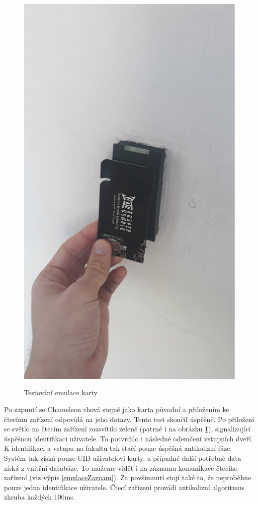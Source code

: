\begin{figure}[ht]\centering
  \centering
  \includegraphics[width=\linewidth, angle=270]{obrazky-figures/obrazekPokusEmulace.jpg}\\[1pt]  
  \caption{Testování emulace karty}    
  \label{obrazekPokusEmulace}
\end{figure}
Po zapnutí se Chameleon chová stejně jako karta původní a přiložením ke čtecímu zařízení odpovídá na jeho dotazy. Tento test skončil úspěšně. Po přiložení se světlo na čtecím zařízení rozsvítilo zeleně (patrné i na obrázku \ref{obrazekPokusEmulace}), signalizující úspěšnou identifikaci uživatele. To potvrdilo i následné odemčení vstupních dveří. K identifikaci a vstupu na fakultu tak stačí pouze úspěšná antikolizní fáze. Systém tak získá pouze UID uživatelovi karty, a případné další potřebné data získá z vnitřní databáze. To můžeme vidět i na záznamu komunikace čtecího zařízení (viz výpis \ref{emulaceZaznam}).  Za povšimnutí stojí také to, že neproběhne pouze jedna identifikace uživatele. Čtecí zařízení provádí antikolizní algoritmus zhruba každých 100ms. 
\par

